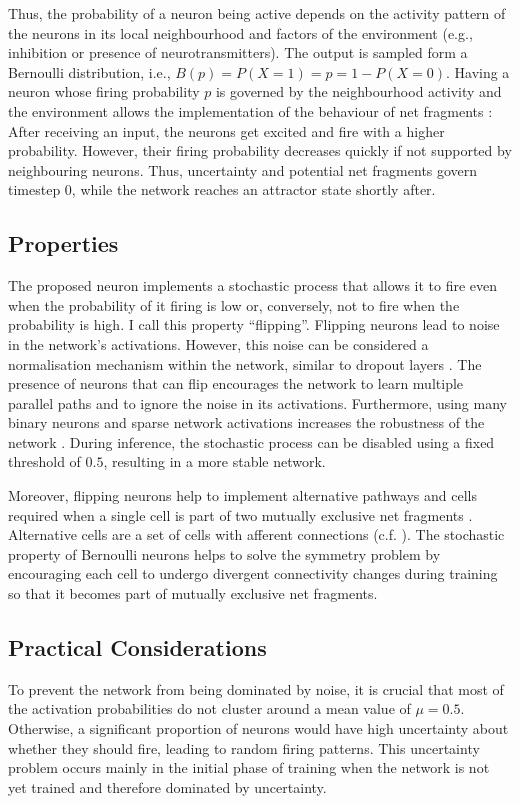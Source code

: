 Thus, the probability of a neuron being active depends on the activity pattern of the neurons in its local neighbourhood and factors of the environment (e.g., inhibition or presence of neurotransmitters).
The output is sampled form a Bernoulli distribution, i.e., $B(p) = P(X = 1) = p = 1 - P(X=0)$. Having a neuron whose firing probability $p$ is governed by the neighbourhood activity and the environment allows the implementation of the behaviour of net fragments : After receiving an input, the neurons get excited and fire with a higher probability. However, their firing probability decreases quickly if not supported by neighbouring neurons. Thus, uncertainty and potential net fragments govern timestep 0, while the network reaches an attractor state shortly after. 

\subsection{Properties}
The proposed neuron implements a stochastic process that allows it to fire even when the probability of it firing is low or, conversely, not to fire when the probability is high.
I call this property ``flipping''.
Flipping neurons lead to noise in the network's activations.
However, this noise can be considered a normalisation mechanism within the network, similar to dropout layers .
The presence of neurons that can flip encourages the network to learn multiple parallel paths and to ignore the noise in its activations.
Furthermore, using many binary neurons and sparse network activations increases the robustness of the network .
During inference, the stochastic process can be disabled using a fixed threshold of $0.5$, resulting in a more stable network.

Moreover, flipping neurons help to implement alternative pathways and cells required when a single cell is part of two mutually exclusive net fragments .
Alternative cells are a set of cells with afferent connections (c.f. ). The stochastic property of Bernoulli neurons helps to solve the symmetry problem by encouraging each cell to undergo divergent connectivity changes during training so that it becomes part of mutually exclusive net fragments.

\subsection{Practical Considerations}
To prevent the network from being dominated by noise, it is crucial that most of the activation probabilities do not cluster around a mean value of $\mu = 0.5$. Otherwise, a significant proportion of neurons would have high uncertainty about whether they should fire, leading to random firing patterns. This uncertainty problem occurs mainly in the initial phase of training when the network is not yet trained and therefore dominated by uncertainty.

